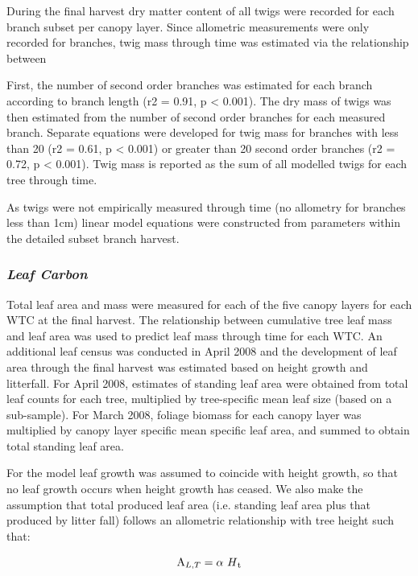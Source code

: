 \documentclass[a4paper]{article}
\begin{document}
During the final harvest dry matter content of all twigs were recorded for each branch subset per canopy layer. Since allometric measurements were only recorded for branches, twig mass through time was estimated via the relationship between 

First, the number of second order branches was estimated for each branch according to branch length (r2 = 0.91, p < 0.001).  The dry mass of twigs was then estimated from the number of second order branches for each measured branch. Separate equations were developed for twig mass for branches with less than 20 (r2 = 0.61, p < 0.001) or greater than 20 second order branches (r2 = 0.72, p < 0.001).   Twig mass is reported as the sum of all modelled twigs for each tree through time.  

As twigs were not empirically measured through time (no allometry for branches less than 1cm) linear model equations were constructed from parameters within the detailed subset branch harvest. 

\subsubsection*{\textit{Leaf Carbon}}

Total leaf area and mass were measured for each of the five canopy layers for each WTC at the final harvest.  The relationship between cumulative tree leaf mass and leaf area was used to predict leaf mass through time for each WTC.  An additional leaf census was conducted in April 2008 and the development of leaf area through the final harvest was estimated based on height growth and litterfall. For April 2008, estimates of standing leaf area were obtained from total leaf counts for each tree, multiplied by tree-specific mean leaf size (based on a sub-sample). For March 2008, foliage biomass for each canopy layer was multiplied by canopy layer specific mean specific leaf area, and summed to obtain total standing leaf area.

For the model leaf growth was assumed to coincide with height growth, so that no leaf growth occurs when height growth has ceased.  We also make the assumption that total produced leaf area (i.e. standing leaf area plus that produced by litter fall) follows an allometric relationship with tree height such that:

\begin{equation}  \text{A}_{L,T} = \alpha~H\textsubscript{t}
\label{eq:leafarea}
\end{equation}
\end{document}
